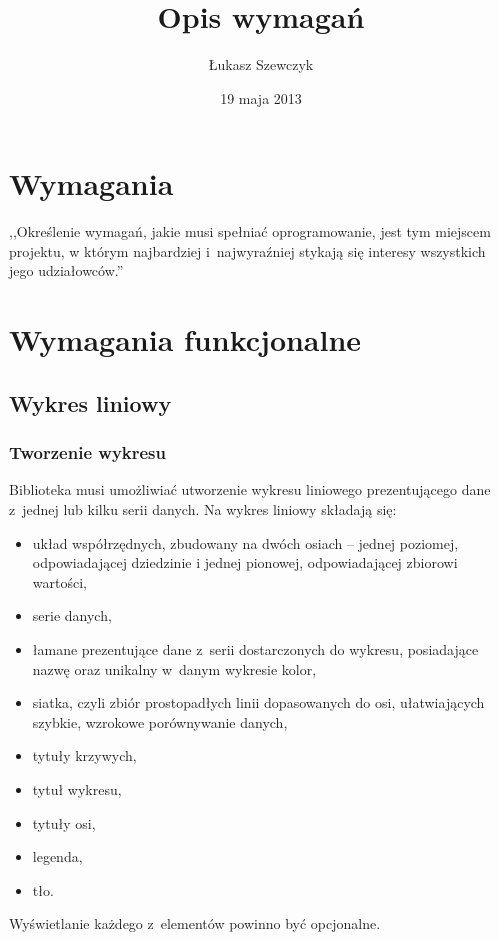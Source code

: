 \documentclass[11pt,twoside,a4paper,final]{article}
\begin{document}
\date{19 maja 2013}
\title{Opis wymagań}

\author{Łukasz Szewczyk}

\maketitle

\section{Wymagania}
,,Określenie wymagań, jakie musi spełniać oprogramowanie, jest tym miejscem projektu, w którym najbardziej i~najwyraźniej stykają się interesy wszystkich jego udziałowców.''~\cite{sacha-wymagania}

\section{Wymagania funkcjonalne}
\subsection{Wykres liniowy}
\subsubsection{Tworzenie wykresu}
Biblioteka musi umożliwiać utworzenie wykresu liniowego prezentującego dane z~jednej lub kilku serii danych. Na wykres liniowy składają się:
\begin{itemize}
\item{układ współrzędnych, zbudowany na dwóch osiach -- jednej poziomej, odpowiadającej dziedzinie i jednej pionowej, odpowiadającej zbiorowi wartości,}
\item{serie danych,}
\item{łamane prezentujące dane z~serii dostarczonych do wykresu, posiadające nazwę oraz unikalny w~danym wykresie kolor,}
\item{siatka, czyli zbiór prostopadłych linii dopasowanych do osi, ułatwiających szybkie, wzrokowe porównywanie danych,}
\item{tytuły krzywych,}
\item{tytuł wykresu,}
\item{tytuły osi,}
\item{legenda,}
\item{tło.}
\end{itemize}

Wyświetlanie każdego z~elementów powinno być opcjonalne. 
\end{document}
